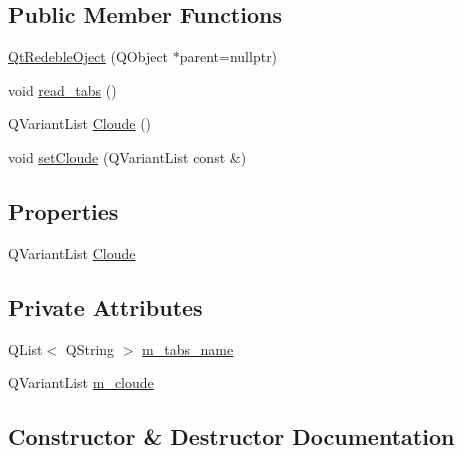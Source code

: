 \subsection*{Public Member Functions}
\begin{DoxyCompactItemize}
\item 
\mbox{\hyperlink{classQtRedebleOject_abc6933ef75120d10e80802e06592fed1}{Qt\+Redeble\+Oject}} (Q\+Object $\ast$parent=nullptr)
\item 
void \mbox{\hyperlink{classQtRedebleOject_ac178c68dbe47c7cbc19b51b562b531cd}{read\+\_\+tabs}} ()
\item 
Q\+Variant\+List \mbox{\hyperlink{classQtRedebleOject_a0a069430156e5631382805e93ef1e48c}{Cloude}} ()
\item 
void \mbox{\hyperlink{classQtRedebleOject_a7e69966f35cd4d6132c0178bcda568c7}{set\+Cloude}} (Q\+Variant\+List const \&)
\end{DoxyCompactItemize}
\subsection*{Properties}
\begin{DoxyCompactItemize}
\item 
Q\+Variant\+List \mbox{\hyperlink{classQtRedebleOject_aefdea864a0c62b6b4a25e55b3c21b092}{Cloude}}
\end{DoxyCompactItemize}
\subsection*{Private Attributes}
\begin{DoxyCompactItemize}
\item 
Q\+List$<$ Q\+String $>$ \mbox{\hyperlink{classQtRedebleOject_af94c47a419d57f7f2e0f7d9530b4598d}{m\+\_\+tabs\+\_\+name}}
\item 
Q\+Variant\+List \mbox{\hyperlink{classQtRedebleOject_a24d809eb7ef38bd05bb5c35f32ff8e11}{m\+\_\+cloude}}
\end{DoxyCompactItemize}


\subsection{Constructor \& Destructor Documentation}
\mbox{\label{classQtRedebleOject_abc6933ef75120d10e80802e06592fed1}} 
